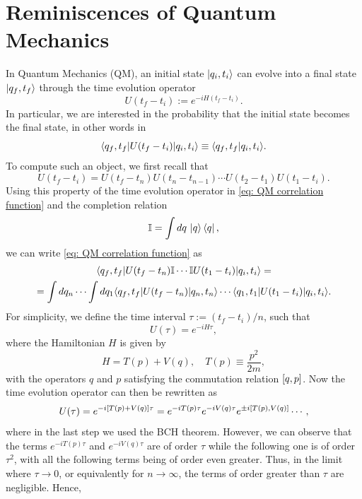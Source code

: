 \section{Reminiscences of Quantum Mechanics}
In Quantum Mechanics (QM), an initial state $\ket{q_i,t_i}$ can evolve into a final state $\ket{q_f,t_f}$ through the time evolution operator 
\begin{equation}
    U(t_f - t_i) := e^{-iH(t_f - t_i)}. 
\end{equation}
In particular, we are interested in the probability that the initial state becomes the final state, in other words in 
\begin{equation}
\label{eq: QM correlation function}
    \langle q_f,t_f | U(t_f - t_i) | q_i,t_i \rangle \equiv \langle q_f,t_f | q_i,t_i \rangle.
\end{equation}
To compute such an object, we first recall that 
\begin{equation}
    U(t_f - t_i) = U(t_f - t_n)U(t_n - t_{n - 1}) \cdots U(t_2 - t_1)U(t_1 - t_i).
\end{equation}
Using this property of the time evolution operator in \eqref{eq: QM correlation function} and the completion relation 
\begin{equation}
    \mathbb{I} = \int dq\,\ket{q}\bra{q},
\end{equation}
we can write \eqref{eq: QM correlation function} as 
\begin{multline}
    \langle q_f,t_f | U(t_f - t_n) \mathbb{I} \cdots \mathbb{I} U(t_1 - t_i) | q_i,t_i \rangle = \\ 
    = \int dq_n\cdots\int dq_1\langle q_f,t_f | U(t_f - t_n) | q_n,t_n \rangle\cdots\langle q_1,t_1 | U(t_1 - t_i) | q_i,t_i \rangle.
\end{multline}
For simplicity, we define the time interval $\tau := (t_f - t_i)/n$, such that 
\begin{equation}
    U(\tau) = e^{-iH\tau},
\end{equation}
where the Hamiltonian $H$ is given by 
\begin{equation}
    H = T(p) + V(q),\quad T(p) \equiv \frac{p^2}{2m},
\end{equation}
with the operators $q$ and $p$ satisfying the commutation relation $[q,p]$. Now the time evolution operator can then be rewritten as 
\begin{equation}
    U(\tau) = e^{-i[T(p) + V(q)]\tau} = e^{-iT(p)\tau}e^{-iV(q)\tau}e^{\pm i[T(p),V(q)]}\cdots,
\end{equation}
where in the last step we used the BCH theorem. However, we can observe that the terms $e^{-iT(p)\tau}$ and $e^{-iV(q)\tau}$ are of order $\tau$ while the following one is of order $\tau^2$, with all the following terms being of order even greater. Thus, in the limit where $\tau \to 0$, or equivalently for $n \to \infty$, the terms of order greater than $\tau$ are negligible. Hence,
